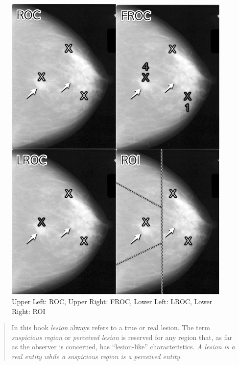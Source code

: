 \documentclass[
]{book}
\begin{document}
\begin{figure}
\includegraphics[width=1\linewidth]{images/4Paradigms} \caption{Upper Left: ROC, Upper Right: FROC, Lower Left: LROC, Lower Right: ROI}\label{fig:froc-paradigm-4}
\end{figure}

\begin{quote}
In this book \emph{lesion} always refers to a true or real lesion. The term \emph{suspicious region} or \emph{perceived lesion} is reserved for any region that, as far as the observer is concerned, has ``lesion-like'' characteristics. \emph{A lesion is a real entity while a suspicious region is a perceived entity.}
\end{quote}
\end{document}
